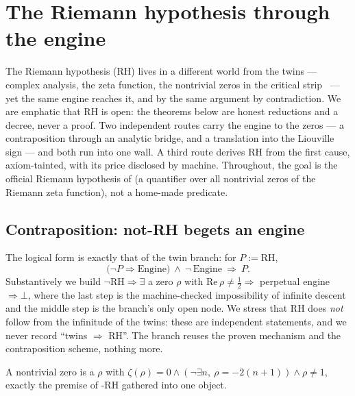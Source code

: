 \section{The Riemann hypothesis through the engine}\label{sec:riemann}

The Riemann hypothesis (RH) lives in a different world from the twins --- complex analysis, the
zeta function, the nontrivial zeros in the critical strip~\cite{clay-rh} --- yet the same engine
reaches it, and by the same argument by contradiction. We are emphatic that RH is \red{} open: the
theorems below are honest reductions and a decree, never a proof. Two independent routes carry the
engine to the zeros --- a contraposition through an analytic bridge, and a translation into the
Liouville sign --- and both run into one wall. A third route derives RH from the first cause,
\yellow{} axiom-tainted, with its price disclosed by machine. Throughout, the goal is the official
Riemann hypothesis of  (a quantifier over all nontrivial zeros of the Riemann zeta
function), not a home-made predicate.

\subsection{Contraposition: not-RH begets an engine}

The logical form is exactly that of the twin branch: for $P := \mathrm{RH}$,
\begin{equation}\label{eq:riemann-contraposition}
  \bigl(\neg P \Rightarrow \text{Engine}\bigr)\ \wedge\ \neg\,\text{Engine}\ \Longrightarrow\ P .
\end{equation}
Substantively we build $\neg\mathrm{RH} \Rightarrow \exists$ a zero $\rho$ with
$\mathrm{Re}\,\rho \ne \tfrac12 \Rightarrow$ perpetual engine $\Rightarrow \bot$, where the last
step is the machine-checked impossibility of infinite descent and the middle step is the branch's
only open node. We stress that RH does \emph{not} follow from the infinitude of the twins: these are
independent statements, and we never record ``twins $\Rightarrow$ RH''. The branch reuses the proven
mechanism and the contraposition scheme, nothing more.

\begin{definition}\label{def:NontrivialZeroM}
A nontrivial zero is a $\rho$ with
$\zeta(\rho)=0 \wedge (\neg\exists n,\ \rho = -2(n{+}1)) \wedge \rho \ne 1$,
exactly the premise of -RH gathered into one object. 
\end{definition}


